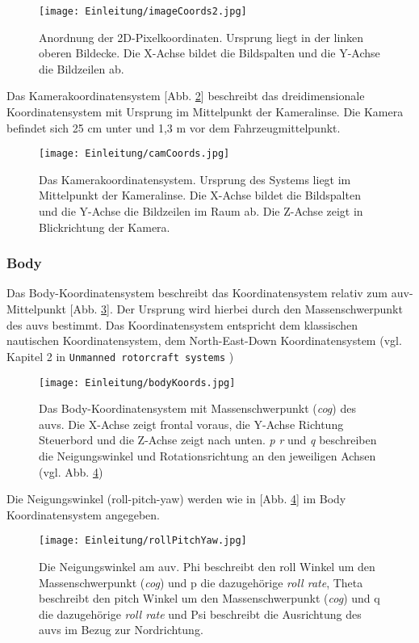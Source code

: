 \begin{figure}[H]
	\centering
	\texttt{[image: Einleitung/imageCoords2.jpg]}
	\caption[Das Bildkoordinatensystem]{Anordnung der 2D-Pixelkoordinaten. Ursprung liegt in der linken oberen Bildecke. Die X-Achse bildet die Bildspalten und die Y-Achse die Bildzeilen ab.}
	\label{imageKoords}
\end{figure}
Das Kamerakoordinatensystem [Abb. \ref{CamKoords}] beschreibt das dreidimensionale Koordinatensystem mit Ursprung im Mittelpunkt der Kameralinse. Die Kamera befindet sich 25 cm unter und 1,3 m vor dem Fahrzeugmittelpunkt.
\begin{figure}[H]
	\centering
	\texttt{[image: Einleitung/camCoords.jpg]}
	\caption[Das Kamerakoordinatensystem]{Das Kamerakoordinatensystem. Ursprung des Systems liegt im Mittelpunkt der Kameralinse. Die X-Achse bildet die Bildspalten und die Y-Achse die Bildzeilen im Raum ab. Die Z-Achse zeigt in Blickrichtung der Kamera.}
	\label{CamKoords}
\end{figure}

\subsubsection{Body}
Das Body-Koordinatensystem beschreibt das Koordinatensystem relativ zum \gls{auv}-Mittelpunkt [Abb. \ref{Abb. 1}].
Der Ursprung wird hierbei durch den Massenschwerpunkt des \gls{auv}s bestimmt.
Das Koordinatensystem entspricht dem klassischen nautischen Koordinatensystem, dem North-East-Down Koordinatensystem (vgl. Kapitel 2 in \texttt{Unmanned rotorcraft systems} \cite{cai2011unmanned})
\begin{figure}[H]
	\centering
	\texttt{[image: Einleitung/bodyKoords.jpg]}
	\caption[Das Body-Koordinatensystem]{Das Body-Koordinatensystem mit Massenschwerpunkt (\textit{cog}) des \gls{auv}s. Die X-Achse zeigt frontal voraus, die Y-Achse Richtung Steuerbord und die Z-Achse zeigt nach unten. \textit{p} \textit{r} und \textit{q} beschreiben die Neigungswinkel und Rotationsrichtung an den jeweiligen Achsen (vgl. Abb. \ref{Abb. 2})}
	\label{Abb. 1}
\end{figure}

Die Neigungswinkel (\gls{roll}-\gls{pitch}-\gls{yaw}) werden wie in [Abb. \ref{Abb. 2}] im Body Koordinatensystem angegeben.
\begin{figure}[H]
	\centering
	\texttt{[image: Einleitung/rollPitchYaw.jpg]}
	\caption[Die Neigungswinkel im Body-Koordinatensystem]{Die Neigungswinkel am \gls{auv}. Phi beschreibt den \gls{roll} Winkel um den Massenschwerpunkt (\textit{cog}) und p die dazugehörige \textit{roll rate},  Theta beschreibt den \gls{pitch} Winkel um den Massenschwerpunkt (\textit{cog}) und q die dazugehörige \textit{roll rate} und  Psi beschreibt die Ausrichtung des \gls{auv}s im Bezug zur Nordrichtung.}
	\label{Abb. 2}
\end{figure}
